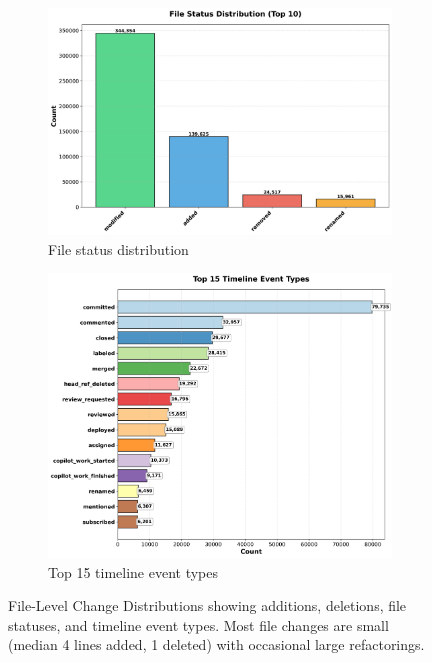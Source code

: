\documentclass[11pt]{article}
\begin{document}
\begin{figure}[H]
\begin{subfigure}[b]{0.48\textwidth}
\centering
\includegraphics[width=\textwidth]{figures_individual/27_file_status_distribution.png}
\caption{File status distribution}
\label{fig:file_status}
\end{subfigure}
\hfill
\begin{subfigure}[b]{0.48\textwidth}
\centering
\includegraphics[width=\textwidth]{figures_individual/30_timeline_event_types_barplot.png}
\caption{Top 15 timeline event types}
\label{fig:event_types}
\end{subfigure}

\caption{File-Level Change Distributions showing additions, deletions, file statuses, and timeline event types. Most file changes are small (median 4 lines added, 1 deleted) with occasional large refactorings.}
\label{fig:file_level_all}
\end{figure}
\end{document}
